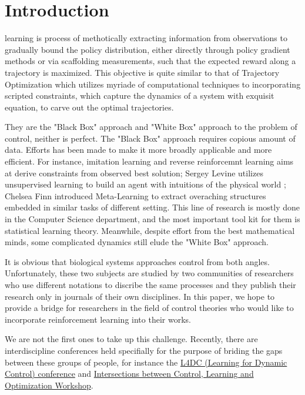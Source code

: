 \documentclass[journal]{IEEEtran}
\begin{document}
\section{Introduction}
 learning is process of methotically extracting information from observations to gradually bound the policy distribution, either directly through policy gradient methods or via scaffolding measurements, such that the expected reward along a trajectory is maximized. This objective is quite similar to that of Trajectory Optimization which utilizes myriade of computational techniques to incorporating scripted constraints, which capture the dynamics of a system with exquisit equation, to carve out the optimal trajectories.

They are the "Black Box" approach and "White Box" approach to the problem of control, neither is perfect.
The "Black Box" approach requires copious amount of data. Efforts has been made to make it more broadly applicable and more efficient. For instance, imitation learning and reverse reinforcemnt learning \cite{Ho2016GenerativeAI} aims at derive constraints from observed best solution; Sergey Levine utilizes unsupervised learning to build an agent with intuitions of the physical world \cite{Finn2016UnsupervisedLF}; Chelsea Finn introduced Meta-Learning \cite{Finn2017ModelAgnosticMF} to extract overaching structures embedded in similar tasks of different setting. This line of research is mostly done in the Computer Science department, and the most important tool kit for them is statistical learning theory. Meanwhile, despite effort from the best mathematical minds, some complicated dynamics still elude the "White Box" approach.

It is obvious that biological systems approaches control from both angles. Unfortunately, these two subjects are studied by two communities of researchers who use different notations to discribe the same processes and they publish their research only in journals of their own disciplines. In this paper, we hope to provide a bridge for researchers in the field of control theories who would like to incorporate reinforcement learning into their works.

We are not the first ones to take up this challenge. Recently, there are interdiscipline conferences held specifially for the purpose of briding the gaps between these groups of people, for instance the \href{https://l4dc.mit.edu/}{L4DC (Learning for Dynamic Control) conference} and \href{https://www.ipam.ucla.edu/programs/workshops/intersections-between-control-learning-and-optimization/}{Intersections between Control, Learning and Optimization Workshop}.
\end{document}
